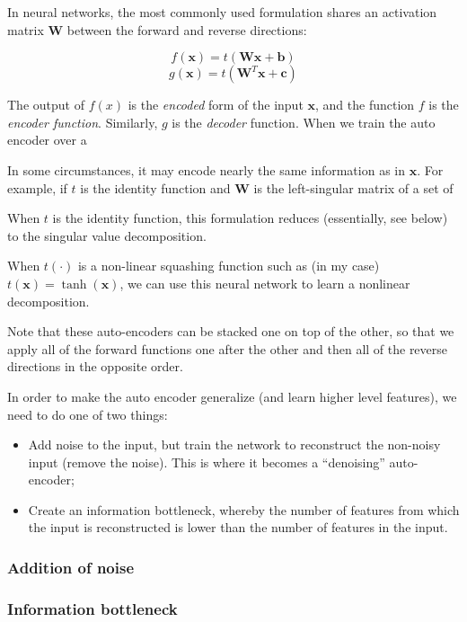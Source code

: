 \documentclass{article}
\begin{document}
In neural networks, the most commonly used formulation shares an activation matrix $\mathbf{W}$ between the forward and reverse directions:

$$
f(\mathbf{x}) = t(\mathbf{Wx} + \mathbf{b})
$$
$$
g(\mathbf{x}) = t(\mathbf{W}^T\mathbf{x} + \mathbf{c})
$$

The output of $f(x)$ is the \emph{encoded} form of the input $\mathbf{x}$, and the function $f$ is the \emph{encoder function}.  Similarly, $g$ is the \emph{decoder} function.  When we train the auto encoder over a 

In some circumstances, it may encode nearly the same information as in $\mathbf{x}$.  For example, if $t$ is the identity function and $\mathbf{W}$ is the left-singular matrix of a set of 

When $t$ is the identity function, this formulation reduces (essentially, see below) to the singular value decomposition.

When $t(\cdot)$ is a non-linear squashing function such as (in my case) $t(\mathbf{x}) = \tanh(\mathbf{x})$, we can use this neural network to learn a nonlinear decomposition.

Note that these auto-encoders can be stacked one on top of the other, so that we apply all of the forward functions one after the other and then all of the reverse directions in the opposite order.

In order to make the auto encoder generalize (and learn higher level features), we need to do one of two things:

\begin{itemize}
\item Add noise to the input, but train the network to reconstruct the non-noisy input (remove the noise).  This is where it becomes a ``denoising'' auto-encoder;
\item Create an information bottleneck, whereby the number of features from which the input is reconstructed is lower than the number of features in the input.
\end{itemize}

\subsubsection{Addition of noise}

\subsubsection{Information bottleneck}
\end{document}
